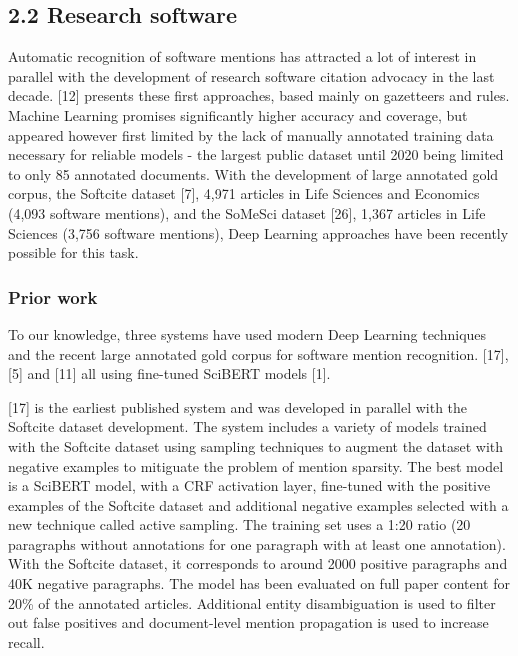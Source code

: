 \documentclass[
]{article}
\begin{document}
\hypertarget{research-software}{%
\subsection{2.2 Research software}\label{research-software}}

Automatic recognition of software mentions has attracted a lot of
interest in parallel with the development of research software citation
advocacy in the last decade. {[}12{]} presents these first approaches,
based mainly on gazetteers and rules. Machine Learning promises
significantly higher accuracy and coverage, but appeared however first
limited by the lack of manually annotated training data necessary for
reliable models - the largest public dataset until 2020 being limited to
only 85 annotated documents. With the development of large annotated
gold corpus, the Softcite dataset {[}7{]}, 4,971 articles in Life
Sciences and Economics (4,093 software mentions), and the SoMeSci
dataset {[}26{]}, 1,367 articles in Life Sciences (3,756 software
mentions), Deep Learning approaches have been recently possible for this
task.

\hypertarget{prior-work}{%
\subsubsection{Prior work}\label{prior-work}}

To our knowledge, three systems have used modern Deep Learning
techniques and the recent large annotated gold corpus for software
mention recognition. {[}17{]}, {[}5{]} and {[}11{]} all using fine-tuned
SciBERT models {[}1{]}.

{[}17{]} is the earliest published system and was developed in parallel
with the Softcite dataset development. The system includes a variety of
models trained with the Softcite dataset using sampling techniques to
augment the dataset with negative examples to mitiguate the problem of
mention sparsity. The best model is a SciBERT model, with a CRF
activation layer, fine-tuned with the positive examples of the Softcite
dataset and additional negative examples selected with a new technique
called active sampling. The training set uses a 1:20 ratio (20
paragraphs without annotations for one paragraph with at least one
annotation). With the Softcite dataset, it corresponds to around 2000
positive paragraphs and 40K negative paragraphs. The model has been
evaluated on full paper content for 20\% of the annotated articles.
Additional entity disambiguation is used to filter out false positives
and document-level mention propagation is used to increase recall.
\end{document}
